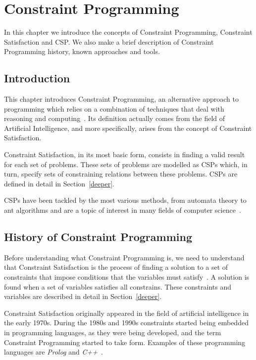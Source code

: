 \chapter{Constraint Programming}

In this chapter we introduce the concepts of Constraint Programming, Constraint Satisfaction and \acf{CSP}. We also make a brief description of Constraint Programming history, known approaches and tools.

\section{Introduction}

This chapter introduces Constraint Programming, an alternative approach to programming which relies on a combination of techniques that deal with reasoning and computing~\cite{Apt2003}. Its definition actually comes from the field of Artificial Intelligence, and more specifically, arises from the concept of Constraint Satisfaction.

Constraint Satisfaction, in its most basic form, consists in finding a valid result for each set of problems. These sets of problems are modelled as \acp{CSP} which, in turn, specify sets of constraining relations between these problems. \acp{CSP} are defined in detail in Section~\ref{deeper}. 

\acp{CSP} have been tackled by the most various methods, from automata theory to ant algorithms and are a topic of interest in many fields of computer science~\cite{rossi2006handbook}.

\section{History of Constraint Programming}

Before understanding what Constraint Programming is, we need to understand that Constraint Satisfaction is the process of finding a solution to a set of constraints that impose conditions that the variables must satisfy~\cite{Apt2003}. A solution is found when a set of variables satisfies all constrains. These constraints and variables are described in detail in Section~\ref{deeper}.

Constraint Satisfaction originally appeared in the field of artificial intelligence in the early 1970s. During the 1980s and 1990s constraints started being embedded in programming languages, as they were being developed, and the term Constraint Programming started to take form. Examples of these programming languages are \textit{Prolog} and \textit{C++}~\cite{Apt2003}.

